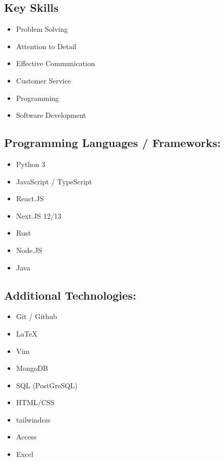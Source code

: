 \documentclass[9pt]{extarticle}
\begin{document}
\begin{minipage}{0.3\textwidth}
	\raggedright
	\begin{tcolorbox}[colback=grey]

		\section{Key Skills}

		\begin{itemize}[leftmargin=*]
			\item Problem Solving
			\item Attention to Detail
			\item Effective Communication
			\item Customer Service
			\item Programming
			\item Software Development
		\end{itemize}

		\subsection{Programming Languages / Frameworks:}
		\begin{itemize}[leftmargin=*]

			\item Python 3
			\item JavaScript / TypeScript
			\item React.JS
			\item Next.JS 12/13
			\item Rust
			\item Node.JS
			\item Java

		\end{itemize}

		\subsection{Additional Technologies:}
		\begin{itemize}[leftmargin=*]
			\item Git / Github
			\item LaTeX
			\item Vim
			\item MongoDB
			\item SQL (PostGreSQL)
			\item HTML/CSS
			\item tailwindcss
			\item Access
			\item Excel
		\end{itemize}

	\end{tcolorbox}

\end{minipage}
\end{document}

